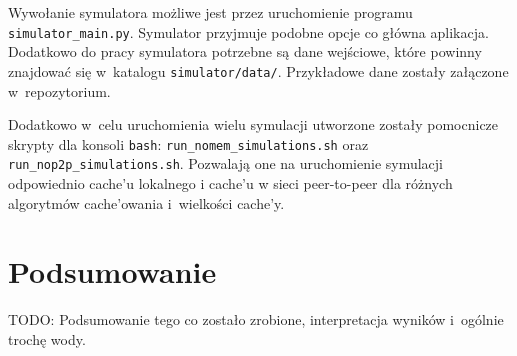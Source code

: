 \documentclass[a4paper,11pt]{scrartcl}
\newcommand{\f}{\texttt}
\newcommand{\s}{ }
\newcommand{\keszy}{cache'y}
\newcommand{\keszu}{cache'u}
\newcommand{\keszowania}{cache'owania}
\begin{document}
Wywołanie symulatora możliwe jest przez uruchomienie programu \f{simulator\_main.py}. Symulator przyjmuje podobne opcje co główna aplikacja. Dodatkowo do pracy symulatora potrzebne są dane wejściowe, które powinny znajdować się w~katalogu \f{simulator/data/}. Przykładowe dane zostały załączone w~repozytorium.

Dodatkowo w~celu uruchomienia wielu symulacji utworzone zostały pomocnicze skrypty dla konsoli \f{bash}: \f{run\_nomem\_simulations.sh} oraz \f{run\_nop2p\_simulations.sh}. Pozwalają one na uruchomienie symulacji odpowiednio \keszu\s lokalnego i \keszu\s w sieci peer-to-peer dla różnych algorytmów \keszowania\s i~wielkości \keszy.


\section{Podsumowanie}

TODO: Podsumowanie tego co zostało zrobione, interpretacja wyników i~ogólnie trochę wody.




\end{document}
